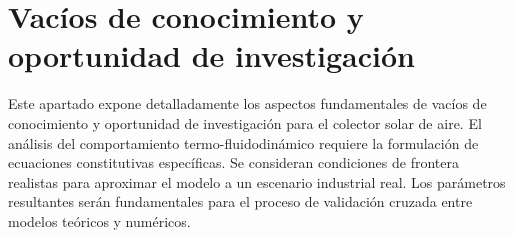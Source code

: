 \section{Vacíos de conocimiento y oportunidad de investigación}
\label{sec:cap03_vacios}

Este apartado expone detalladamente los aspectos fundamentales de vacíos de conocimiento y oportunidad de investigación para el colector solar de aire.
El análisis del comportamiento termo-fluidodinámico requiere la formulación de ecuaciones constitutivas específicas.
Se consideran condiciones de frontera realistas para aproximar el modelo a un escenario industrial real.
Los parámetros resultantes serán fundamentales para el proceso de validación cruzada entre modelos teóricos y numéricos.
